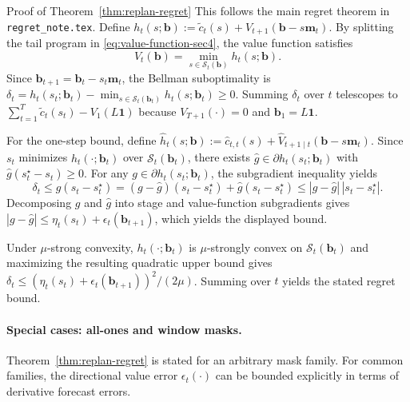 \documentclass{uai2026} %
\newcommand{\1}{\mathbf{1}}
\newcommand{\scalt}{\mathcal{S}_{t}}
\begin{document}
\begin{appendixproof}{Proof of Theorem~\ref{thm:replan-regret}}
  This follows the main regret theorem in \texttt{regret\_note.tex}.
  Define $h_t(s;\mathbf{b}) := \tilde{c}_t(s)+V_{t+1}(\mathbf{b}-s\mathbf{m}_t)$.
  By splitting the tail program in \eqref{eq:value-function-sec4}, the value function satisfies
  \begin{equation*}
    V_t(\mathbf{b}) = \min_{s\in\scalt(\mathbf{b})} h_t(s;\mathbf{b}).
  \end{equation*}
  Since $\mathbf{b}_{t+1}=\mathbf{b}_t-s_t\mathbf{m}_t$, the Bellman suboptimality is
  $\delta_t=h_t(s_t;\mathbf{b}_t)-\min_{s\in\scalt(\mathbf{b}_t)} h_t(s;\mathbf{b}_t)\ge 0$.
  Summing $\delta_t$ over $t$ telescopes to $\sum_{t=1}^{T}\tilde{c}_t(s_t)-V_1(L\1)$ because $V_{T+1}(\cdot)=0$ and $\mathbf{b}_1=L\1$.

  For the one-step bound, define $\hat{h}_t(s;\mathbf{b}) := \hat{c}_{t,t}(s)+\hat{V}_{t+1\mid t}(\mathbf{b}-s\mathbf{m}_t)$.
  Since $s_t$ minimizes $\hat{h}_t(\cdot;\mathbf{b}_t)$ over $\scalt(\mathbf{b}_t)$, there exists $\hat{g}\in\partial \hat{h}_t(s_t;\mathbf{b}_t)$ with $\hat{g}(s_t^{\star}-s_t)\ge 0$.
  For any $g\in \partial h_t(s_t;\mathbf{b}_t)$, the subgradient inequality yields
  \begin{equation*}
    \delta_t \le g(s_t-s_t^{\star}) = (g-\hat{g})(s_t-s_t^{\star}) + \hat{g}(s_t-s_t^{\star})
    \le |g-\hat{g}|\,|s_t-s_t^{\star}|.
  \end{equation*}
  Decomposing $g$ and $\hat{g}$ into stage and value-function subgradients gives
  $|g-\hat{g}|\le \eta_t(s_t)+\epsilon_t(\mathbf{b}_{t+1})$, which yields the displayed bound.

  Under $\mu$-strong convexity, $h_t(\cdot;\mathbf{b}_t)$ is $\mu$-strongly convex on $\scalt(\mathbf{b}_t)$ and maximizing the resulting quadratic upper bound gives
  $\delta_t \le (\eta_t(s_t)+\epsilon_t(\mathbf{b}_{t+1}))^2/(2\mu)$.
  Summing over $t$ yields the stated regret bound.
\end{appendixproof}

\paragraph{Special cases: all-ones and window masks.}
Theorem~\ref{thm:replan-regret} is stated for an arbitrary mask family.
For common families, the directional value error $\epsilon_t(\cdot)$ can be bounded explicitly in terms of derivative forecast errors.
\end{document}
